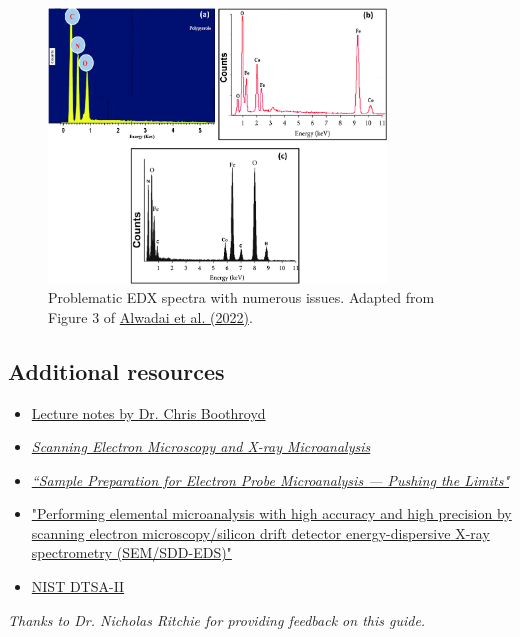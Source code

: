 \documentclass[letterpaper, 12pt]{article}
\begin{document}
\begin{figure}[h!tbp]
    \centering
    \includegraphics[width=0.8\textwidth]{img/edx/alwadai_edx.png}
    \caption*{Problematic EDX spectra with numerous issues. Adapted from Figure 3 of \href{https://doi.org/10.1007/s10854-022-08265-y}{Alwadai et al. (2022)}.}
\end{figure}

\subsection*{Additional resources}

\begin{itemize}
    \setlength\itemsep{-0.5em}
    \item \href{https://fy.chalmers.se/~f10mh/Halvarsson/EM_intro_course_files/EDX%20intro.pdf}{Lecture notes by Dr. Chris Boothroyd}
    \item \href{https://doi.org/10.1007/978-1-4939-6676-9}{\textit{Scanning Electron Microscopy and X-ray Microanalysis}}
    \item  \href{https://doi.org/10.6028/jres.107.051}{\textit{``Sample Preparation for Electron Probe
Microanalysis — Pushing the Limits"}}
    \item \href{https://doi.org/10.1007/s10853-014-8685-2}{"Performing elemental microanalysis with high accuracy and high precision by scanning electron microscopy/silicon drift detector energy-dispersive X-ray spectrometry (SEM/SDD-EDS)"}
    \item \href{https://www.cstl.nist.gov/div837/837.02/epq/dtsa2/index.html}{NIST DTSA-II}
\end{itemize}

\textit{Thanks to Dr. Nicholas Ritchie for providing feedback on this guide.}

\end{document}
